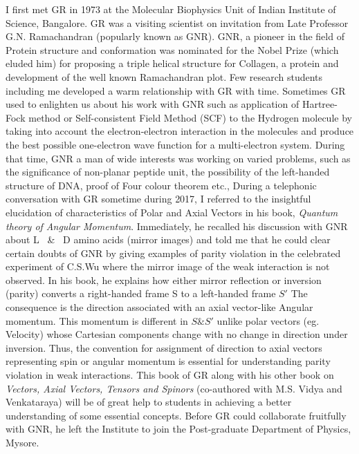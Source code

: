 I first met GR in 1973 at the Molecular Biophysics Unit of Indian Institute of Science, Bangalore. GR was a visiting scientist on invitation from Late Professor G.N. Ramachandran (popularly known as GNR). GNR, a pioneer in the field of Protein structure and conformation was nominated for the Nobel Prize (which eluded him) for proposing a triple helical structure for Collagen, a protein and development of the well known Ramachandran plot. Few research students including me developed a warm relationship with GR with time. Sometimes GR used to enlighten us about his work with GNR such as application of Hartree-Fock method or Self-consistent Field Method (SCF) to the Hydrogen molecule by taking into account the electron-electron interaction in the molecules and produce the best possible one-electron wave function for a multi-electron system. During that time, GNR a man of wide interests was working on varied problems, such as the significance of non-planar peptide unit, the possibility of the left-handed structure of DNA, proof of Four colour theorem etc., During a telephonic conversation with GR sometime during 2017, I referred to the insightful elucidation of characteristics of Polar and Axial Vectors in his book, \textit{Quantum theory of Angular Momentum}. Immediately, he recalled his discussion with GNR about L ~\&~ D amino acids (mirror images) and told me that he could clear certain doubts of GNR by giving examples of parity violation in the celebrated experiment of C.S.Wu where the mirror image of the weak interaction is not observed. In his book, he explains how either mirror reflection or inversion (parity) converts a right-handed frame S to a left-handed frame $S'$ The consequence is the direction associated with an axial vector-like Angular momentum. This momentum is different in $S \& S'$ unlike polar vectors (eg. Velocity) whose Cartesian components change with no change in direction under inversion. Thus, the convention for assignment of direction to axial vectors representing spin or angular momentum is essential for understanding parity violation in weak interactions. This book of GR along with his other book on \textit{Vectors, Axial Vectors, Tensors and Spinors} (co-authored with M.S. Vidya and Venkataraya) will be of great help to students in achieving a better understanding of some essential concepts. Before GR could collaborate fruitfully with GNR, he left the Institute to join the Post-graduate Department of Physics, Mysore.  

